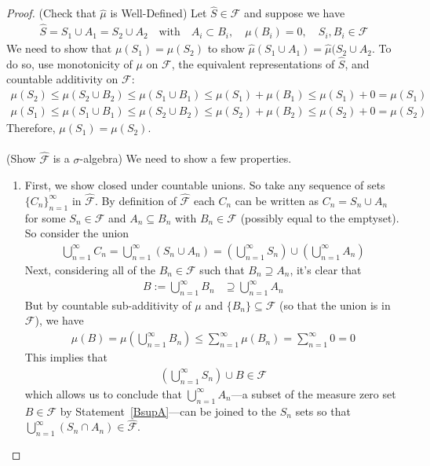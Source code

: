 \documentclass[12pt]{article}
\theoremstyle{plain}
\theoremstyle{definition}
\theoremstyle{remark}
\newcommand{\sF}{\mathscr{F}}
\newcommand{\ninf}{_{n=1}^\infty}
\begin{document}
\begin{proof}
(Check that $\hat{\mu}$ is Well-Defined) Let $\hat{S}\in\sF$ and
suppose we have
\begin{align*}
    \hat{S} = S_1 \cup A_1 = S_2 \cup A_2
    \quad\text{with}\quad
    A_i \subset B_i, \quad \mu(B_i) = 0,
    \quad S_i, B_i \in \sF
\end{align*}
We need to show that $\mu(S_1) = \mu(S_2)$ to show $\hat{\mu}(S_1\cup
A_1) = \hat{\mu}(S_2\cup A_2$. To do so, use monotonicity of $\mu$ on
$\sF$, the equivalent representations of $\hat{S}$, and
countable additivity on $\sF$:
\begin{align*}
  \mu(S_2) \leq \mu(S_2 \cup B_2) \leq
      \mu(S_1 \cup B_1) \leq \mu(S_1) + \mu(B_1)
      \leq \mu(S_1) + 0 = \mu(S_1)  \\
  \mu(S_1) \leq \mu(S_1 \cup B_1) \leq
      \mu(S_2 \cup B_2) \leq \mu(S_2) + \mu(B_2)
      \leq \mu(S_2) + 0 = \mu(S_2)
\end{align*}
Therefore, $\mu(S_1) = \mu(S_2)$.
\\
\\
(Show $\hat{\sF}$ is a $\sigma$-algebra) We need to show a few properties.
\begin{enumerate}
  \item
    First, we show closed under countable unions. So take any sequence
    of sets $\{C_n\}\ninf$ in $\hat{\sF}$. By definition of
    $\hat{\sF}$ each $C_n$ can be written as $C_n=S_n\cup A_n$ for some
    $S_n \in \sF$ and $A_n\subseteq B_n$ with $B_n\in\sF$ (possibly
    equal to the emptyset). So consider the union
    \begin{align*}
        \bigcup^\infty_{n=1} C_n=
        \bigcup^\infty_{n=1} (S_n\cup A_n) =
        \left(\bigcup^\infty_{n=1} S_n\right)
        \cup \left(\bigcup^\infty_{n=1} A_n\right)
    \end{align*}
    Next, considering all of the $B_n\in\sF$ such that $B_n\supseteq
    A_n$, it's clear that
    \begin{align}
        B:=\bigcup^\infty_{n=1} B_n &\supseteq
        \bigcup^\infty_{n=1} A_n
        \label{BsupA}
    \end{align}
    But by countable sub-additivity of $\mu$ and $\{B_n\}\subseteq\sF$
    (so that the union is in $\sF$), we have
    \begin{align}
        \mu(B)
        =\mu\left(\bigcup^\infty_{n=1} B_n \right)
        \leq\sum^\infty_{n=1} \mu\left(B_n \right)
        =\sum^\infty_{n=1} 0 =0
    \end{align}
    This implies that
    \begin{align*}
        \left(\bigcup^\infty_{n=1} S_n\right) \cup B \in
        {\sF}
    \end{align*}
    which allows us to conclude that $\bigcup\ninf A_n$---a subset of
    the measure zero set $B\in\sF$ by Statement~\ref{BsupA}---can be
    joined to the $S_n$ sets so that
    $\bigcup\ninf (S_n \cap A_n)\in\hat{\sF}$.


\end{enumerate}
\end{proof}
\end{document}

